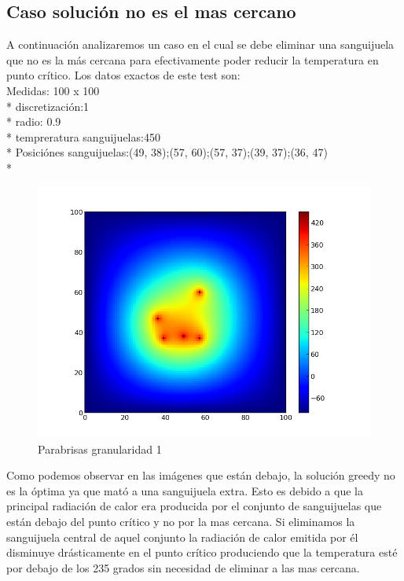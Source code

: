 \subsection{Caso solución no es el mas cercano}

A continuación analizaremos un caso en el cual se debe eliminar una sanguijuela que no es la más cercana para efectivamente poder reducir la temperatura en punto crítico.
Los datos exactos de este test son:\\
Medidas: 100 x 100 \\* 
discretización:1 \\* 
radio: 0.9 \\* 
tempreratura sanguijuelas:450 \\* 
Posiciónes sanguijuelas:(49, 38);(57, 60);(57, 37);(39, 37);(36, 47) \\* 
\begin{figure}[htb]
\begin{center}
\includegraphics[scale=0.40]{imagenes/test6.png} 
\caption{Parabrisas granularidad 1} 
\end{center}
\end{figure}

Como podemos observar en las imágenes que están debajo, la solución greedy no es la óptima ya que mató a una sanguijuela extra. Esto es debido a que la principal radiación de calor era producida por el conjunto de 
sanguijuelas que están debajo del punto crítico y no por la mas cercana. Si eliminamos la sanguijuela central de aquel conjunto la radiación de calor emitida por él disminuye drásticamente en el punto crítico produciendo 
que la temperatura esté por debajo de los 235 grados sin necesidad de eliminar a las mas cercana. 


